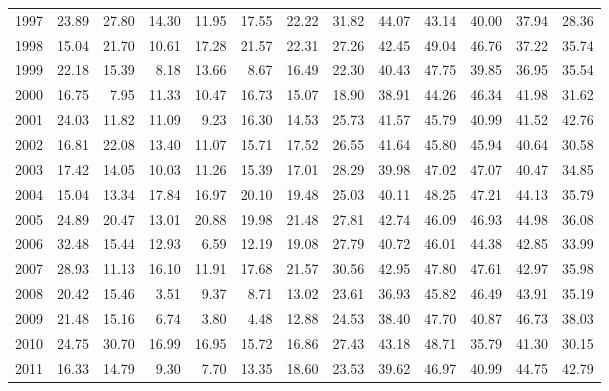 \begin{table}[ht]
\begin{tabular}{rrrrrrrrrrrrr}
  1997 & 23.89 & 27.80 & 14.30 & 11.95 & 17.55 & 22.22 & 31.82 & 44.07 & 43.14 & 40.00 & 37.94 & 28.36 \\ 
  1998 & 15.04 & 21.70 & 10.61 & 17.28 & 21.57 & 22.31 & 27.26 & 42.45 & 49.04 & 46.76 & 37.22 & 35.74 \\ 
  1999 & 22.18 & 15.39 & 8.18 & 13.66 & 8.67 & 16.49 & 22.30 & 40.43 & 47.75 & 39.85 & 36.95 & 35.54 \\ 
  2000 & 16.75 & 7.95 & 11.33 & 10.47 & 16.73 & 15.07 & 18.90 & 38.91 & 44.26 & 46.34 & 41.98 & 31.62 \\ 
  2001 & 24.03 & 11.82 & 11.09 & 9.23 & 16.30 & 14.53 & 25.73 & 41.57 & 45.79 & 40.99 & 41.52 & 42.76 \\ 
  2002 & 16.81 & 22.08 & 13.40 & 11.07 & 15.71 & 17.52 & 26.55 & 41.64 & 45.80 & 45.94 & 40.64 & 30.58 \\ 
  2003 & 17.42 & 14.05 & 10.03 & 11.26 & 15.39 & 17.01 & 28.29 & 39.98 & 47.02 & 47.07 & 40.47 & 34.85 \\ 
  2004 & 15.04 & 13.34 & 17.84 & 16.97 & 20.10 & 19.48 & 25.03 & 40.11 & 48.25 & 47.21 & 44.13 & 35.79 \\ 
  2005 & 24.89 & 20.47 & 13.01 & 20.88 & 19.98 & 21.48 & 27.81 & 42.74 & 46.09 & 46.93 & 44.98 & 36.08 \\ 
  2006 & 32.48 & 15.44 & 12.93 & 6.59 & 12.19 & 19.08 & 27.79 & 40.72 & 46.01 & 44.38 & 42.85 & 33.99 \\ 
  2007 & 28.93 & 11.13 & 16.10 & 11.91 & 17.68 & 21.57 & 30.56 & 42.95 & 47.80 & 47.61 & 42.97 & 35.98 \\ 
  2008 & 20.42 & 15.46 & 3.51 & 9.37 & 8.71 & 13.02 & 23.61 & 36.93 & 45.82 & 46.49 & 43.91 & 35.19 \\ 
  2009 & 21.48 & 15.16 & 6.74 & 3.80 & 4.48 & 12.88 & 24.53 & 38.40 & 47.70 & 40.87 & 46.73 & 38.03 \\ 
  2010 & 24.75 & 30.70 & 16.99 & 16.95 & 15.72 & 16.86 & 27.43 & 43.18 & 48.71 & 35.79 & 41.30 & 30.15 \\ 
  2011 & 16.33 & 14.79 & 9.30 & 7.70 & 13.35 & 18.60 & 23.53 & 39.62 & 46.97 & 40.99 & 44.75 & 42.79 \\ 
   \hline
\end{tabular}
\end{table}
